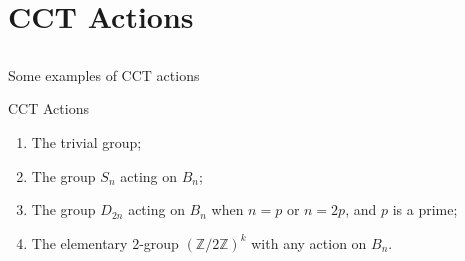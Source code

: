\documentclass{beamer}
\newtheorem{lem}[thm]{Lemma}
\theoremstyle{remark}
\begin{document}
\section{CCT Actions}
\subsection{}






\begin{frame}{Some examples of CCT actions}
\begin{block}{CCT Actions}
\begin{enumerate}
\item The trivial group;
\pause
\item The group $S_n$ acting on $B_n$;
\pause
\item The group $D_{2n}$ acting on $B_{n}$ when $n = p$ or $n = 2p$, and $p$ is a prime;
\pause
\item The elementary $2$-group $(\mathbb Z /2 \mathbb Z)^k$ with any action on $B_n$.
\end{enumerate}
\end{block}
\end{frame}
\end{document}
